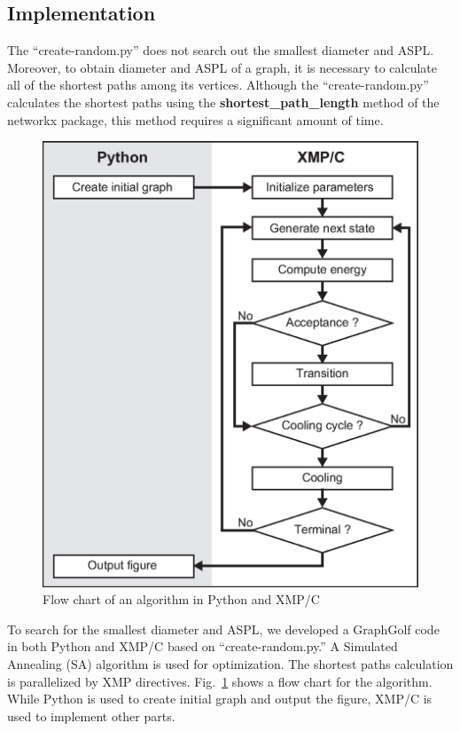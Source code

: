 \documentclass[graybox]{svmult}
\begin{document}
\subsection{Implementation}\label{sec:implementation}
The ``create-random.py'' does not search out the smallest diameter and ASPL. 
Moreover, to obtain diameter and ASPL of a graph, 
it is necessary to calculate all of the shortest paths among its vertices.
Although the ``create-random.py'' calculates the shortest paths using the {\bf shortest\_path\_length} method of the networkx package,
this method requires a significant amount of time.

\begin{figure}[t]
\centering
\includegraphics[scale=0.55,clip]{img/flow.eps}
\caption{Flow chart of an algorithm in Python and XMP/C} \label{fig:flow}
\end{figure}

To search for the smallest diameter and ASPL, 
we developed a GraphGolf code in both Python and XMP/C based on ``create-random.py.'' 
A Simulated Annealing (SA)\cite{Metropolis1953, Kirkpatrick671} algorithm is used for optimization. 
The shortest paths calculation is parallelized by XMP directives. 
Fig.~\ref{fig:flow} shows a flow chart for the algorithm. 
While Python is used to create initial graph and output the figure, 
XMP/C is used to implement other parts.
\end{document}
